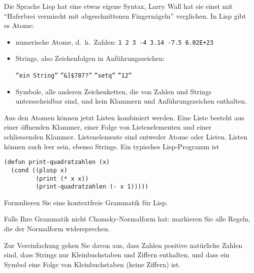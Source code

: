 Die Sprache Lisp hat eine etwas eigene Syntax, Larry Wall hat sie einst
mit ``Haferbrei vermischt mit abgeschnittenen Fingernägeln'' verglichen.
In Lisp gibt es Atome:
\begin{itemize}
\item numerische Atome, d.~h.~Zahlen: {\tt 1 2 3
-4  3.14  -7.5  6.02E+23}
\item Strings, also Zeichenfolgen in Anführungszeichen:
\begin{center}
{\tt \textquotedblright ein String\textquotedblright}
{\tt \textquotedblright \&]\$787?\textquotedblright}
{\tt \textquotedblright setq\textquotedblright}
{\tt \textquotedblright 12\textquotedblright}
\end{center}
\item Symbole, alle anderen Zeichenketten, die von Zahlen und Strings
untersscheidbar sind, und kein Klammern und Anführungszeichen enthalten.
\end{itemize}
Aus den Atomen können jetzt Listen kombiniert werden. Eine Liste besteht
aus einer öffnenden Klammer, einer Folge von Listenelementen und
einer schliessenden Klammer. Listenelemente sind entweder Atome oder Listen.
Listen können auch leer sein, ebenso Strings.
Ein typisches Lisp-Programm ist
\begin{verbatim}
(defun print-quadratzahlen (x)
  (cond ((plusp x)
         (print (* x x))
         (print-quadratzahlen (- x 1)))))
\end{verbatim}
\begin{teilaufgaben}
\item
Formulieren Sie eine kontextfreie Grammatik für Lisp.
\item
Falls Ihre Grammatik nicht Chomsky-Normalform hat: markieren Sie
alle Regeln, die der Normalform widersprechen.
\end{teilaufgaben}


\begin{hinweis}
Zur Vereinfachung gehen Sie davon aus, dass Zahlen positive natürliche
Zahlen sind, dass Strings nur Kleinbuchstaben und Ziffern enthalten, und
dass ein Symbol eine Folge von Kleinbuchstaben (keine Ziffern) ist.
\end{hinweis}

